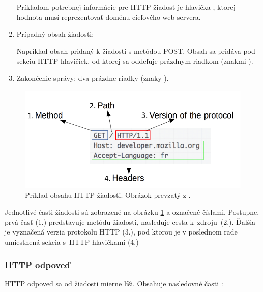 \begin{enumerate}
    Príkladom potrebnej informácie pre HTTP žiadosť je hlavička , ktorej hodnota musí reprezentovať doménu cieľového web servera. 
    
    \item Prípadný obsah žiadosti:

    Napríklad obsah pridaný k žiadosti s metódou POST. 
    Obsah sa pridáva pod sekciu HTTP hlavičiek, od ktorej sa oddeľuje prázdnym riadkom (znakmi ).

    \item Zakončenie správy: dva prázdne riadky (znaky ).

\end{enumerate}

\begin{figure}[htb!]
\begin{center}
    \includegraphics[scale=0.6]{obrazky-figures/http_request.png}
    \caption{Príklad obsahu HTTP žiadosti. Obrázok prevzatý z \cite{mdn-docs-http-overview}.}
    \label{fig:http-request}
\end{center}
\end{figure}

Jednotlivé časti žiadosti sú zobrazené na obrázku \ref{fig:http-request} a označené číslami. Postupne, prvá časť (1.) predstavuje metódu žiadosti, nasleduje cesta \mbox{k zdroju (2.)}. 
Ďalšia je vyznačená verzia protokolu HTTP (3.), pod ktorou je v poslednom rade umiestnená sekcia \mbox{s HTTP} hlavičkami (4.) 


\subsubsection{HTTP odpoveď}

\noindent HTTP odpoveď sa od žiadosti mierne líši. Obsahuje nasledovné časti \cite{rfc7230, mdn-docs-http-overview}:

